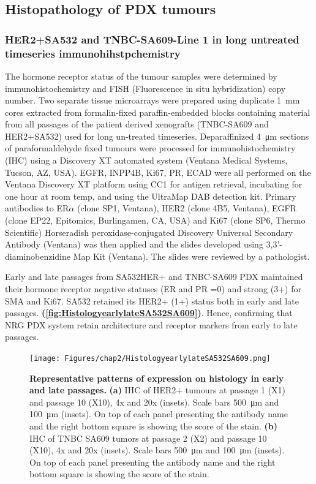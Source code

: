 \subsection{Histopathology of PDX tumours}

\subsubsection{HER2+SA532 and TNBC-SA609-Line 1 in long untreated timeseries immunohihstpchemistry}
The hormone receptor status of the tumour samples were determined by immunohistochemistry and FISH (Fluorescence in situ hybridization) copy number.
Two separate tissue microarrays were prepared using duplicate \SI{1}{\mm} cores extracted from formalin-fixed paraffin-embedded blocks containing material from all passages of the patient derived xenografts (TNBC-SA609 and HER2+SA532) used for long un-treated timeseries. 
Deparaffinized \SI{4}{\um} sections of paraformaldehyde fixed tumours were processed for immunohistochemistry (IHC) using a Discovery XT automated system (Ventana Medical Systems, Tucson, AZ, USA). 
EGFR, INPP4B, Ki67, PR, ECAD were all performed on the Ventana Discovery XT platform using CC1 for antigen retrieval, incubating for one hour at room temp, and using the UltraMap DAB detection kit.
Primary antibodies to ER$\alpha$ (clone SP1, Ventana), HER2 (clone 4B5, Ventana), EGFR (clone EP22, Epitomics, Burlingamen, CA, USA) and Ki67 (clone SP6, Thermo Scientific) 
Horseradish peroxidase-conjugated Discovery Universal Secondary Antibody (Ventana) was then applied and the slides developed using 3,3'-diaminobenzidine Map Kit (Ventana). 
The slides were reviewed by a pathologist. 

Early and late passages from SA532HER+ and TNBC-SA609 PDX  maintained their hormone receptor negative statuses (ER and PR =0) and strong (3+) for SMA and Ki67. SA532 retained its HER2+ (1+) status both in early and late passages.
\textbf{(\autoref{fig:HistologyearlylateSA532SA609})}. Hence, confirming that NRG PDX system retain architecture and receptor markers from early to late passages.

 \begin{figure}
\centering
\texttt{[image: Figures/chap2/HistologyearlylateSA532SA609.png]}
	
\caption[Representative patterns of expression on histology in early and late passages]
	{\small
\textbf{Representative patterns of expression on histology in early and late passages.}
 \textbf{(a)} IHC of HER2+ tumours at passage 1 (X1) and passage 10 (X10), 4x and 20x (insets). Scale bars \SI{500}{\micro\metre} and \SI{100}{\micro\metre} (insets). On top of each panel presenting the antibody name and the right bottom square is showing the score of the stain.
\textbf{(b)} IHC of TNBC SA609 tumors at passage 2 (X2) and passage 10 (X10), 4x and 20x (insets). Scale bars \SI{500}{\micro\metre} and \SI{100}{\micro\metre} (insets). On top of each panel presenting the antibody name and the right bottom square is showing the score of the stain.}
	\label{fig:HistologyearlylateSA532SA609}
\end{figure}


